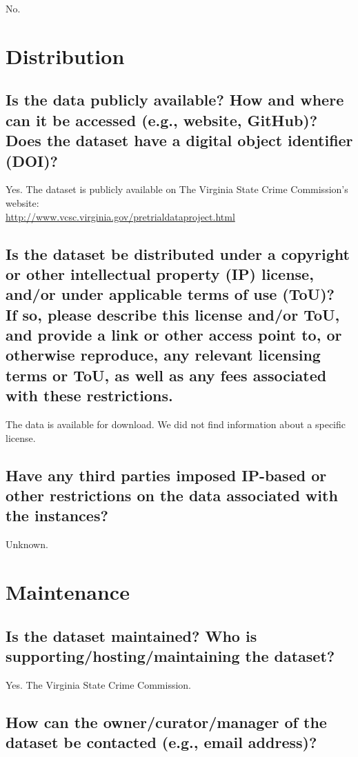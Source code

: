 \documentclass[letterpaper, 10 pt, conference]{ieeeconf}  %
\newcommand{\subtitle}[1]{{\\ \small \normalfont \color{purple} #1}}
\begin{document}
No.

\section{Distribution}
\subsection{Is the data publicly available? How and where can it be accessed (e.g., website, GitHub)? \subtitle{Does the dataset have a digital object identifier (DOI)?}}

Yes. The dataset is publicly available on The Virginia State Crime Commission's website: \\ 
\href {http://www.vcsc.virginia.gov/pretrialdataproject.html}{http://www.vcsc.virginia.gov/pretrialdataproject.html}


\subsection{Is the dataset be distributed under a copyright or other intellectual property (IP) license, and/or under applicable terms of use (ToU)? \subtitle{If so, please describe this license and/or ToU, and provide a link or other access point to, or otherwise reproduce, any relevant licensing terms or ToU, as well as any fees associated with these restrictions.}}

The data is available for download. We did not find information about a specific license. 

\subsection{Have any third parties imposed IP-based or other restrictions on the data associated with the instances?}

Unknown. 

\section{Maintenance}

\subsection{Is the dataset maintained? Who is supporting/hosting/maintaining the dataset?}

Yes. The Virginia State Crime Commission. 

\subsection{How can the owner/curator/manager of the dataset be contacted (e.g., email address)?}
\end{document}
